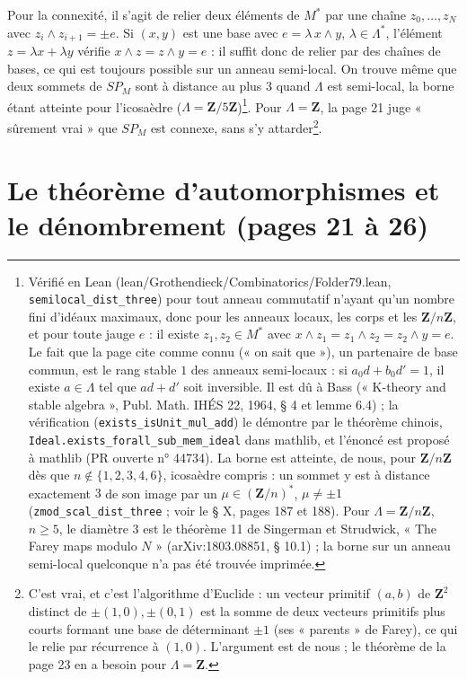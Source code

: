 \documentclass[11pt,a4paper]{article}
\begin{document}
Pour la connexité, il s'agit de relier deux éléments de $M^{*}$ par une chaîne
$z_0, \dots, z_N$ avec $z_i \wedge z_{i+1} = \pm e$. Si $(x, y)$ est une base
avec $e = \lambda\, x \wedge y$, $\lambda \in \Lambda^{*}$, l'élément $z =
\lambda x + \lambda y$ vérifie $x \wedge z = z \wedge y = e$ : il suffit donc de
relier par des chaînes de bases, ce qui est toujours possible sur un anneau
semi-local. On trouve même que deux sommets de $SP_M$ sont à distance au plus
$3$ quand $\Lambda$ est semi-local, la borne étant atteinte pour l'icosaèdre
($\Lambda = \mathbf{Z}/5\mathbf{Z}$)\footnote{Vérifié en Lean
(lean/Grothendieck/Combinatorics/Folder79.lean, \texttt{semilocal\_dist\_three}) pour tout
anneau commutatif n'ayant qu'un nombre fini d'idéaux maximaux, donc pour les
anneaux locaux, les corps et les $\mathbf{Z}/n\mathbf{Z}$, et pour toute jauge
$e$ : il existe $z_1, z_2 \in M^{*}$ avec $x \wedge z_1 = z_1 \wedge z_2 = z_2
\wedge y = e$. Le fait que la page cite comme connu (« on sait que »), un
partenaire de base commun, est le rang stable $1$ des anneaux semi-locaux :
si $a_0d + b_0d' = 1$, il existe $a \in \Lambda$ tel que $ad + d'$ soit
inversible. Il est dû à Bass
(« K-theory and stable algebra », Publ. Math. IHÉS 22, 1964, § 4 et lemme
6.4) ; la vérification (\texttt{exists\_isUnit\_mul\_add}) le démontre par le
théorème chinois, \texttt{Ideal.exists\_forall\_sub\_mem\_ideal} dans mathlib,
et l'énoncé est proposé à mathlib (PR ouverte n° 44734). La borne est
atteinte, de nous, pour $\mathbf{Z}/n\mathbf{Z}$ dès que $n \notin \{1, 2, 3,
4, 6\}$, icosaèdre compris : un sommet y est à distance exactement $3$ de son
image par un $\mu \in (\mathbf{Z}/n)^{*}$, $\mu \neq \pm 1$
(\texttt{zmod\_scal\_dist\_three} ; voir le § X, pages 187 et 188). Pour
$\Lambda = \mathbf{Z}/n\mathbf{Z}$, $n \geq 5$, le diamètre $3$ est le théorème
11 de Singerman et Strudwick, « The Farey maps modulo $N$ » (arXiv:1803.08851,
§ 10.1) ; la borne sur un anneau semi-local quelconque n'a pas été trouvée
imprimée.}. Pour $\Lambda = \mathbf{Z}$, la page 21
juge « sûrement vrai » que $SP_M$ est connexe, sans s'y attarder\footnote{C'est
vrai, et c'est l'algorithme d'Euclide : un vecteur primitif $(a, b)$ de
$\mathbf{Z}^2$ distinct de $\pm(1, 0), \pm(0, 1)$ est la somme de deux vecteurs
primitifs plus courts formant une base de déterminant $\pm 1$ (ses
« parents » de Farey), ce qui le relie par récurrence à $(1, 0)$. L'argument
est de nous ; le théorème de la page 23 en a besoin pour $\Lambda =
\mathbf{Z}$.}.

\section*{Le théorème d'automorphismes et le dénombrement (pages 21 à 26)}
\end{document}
